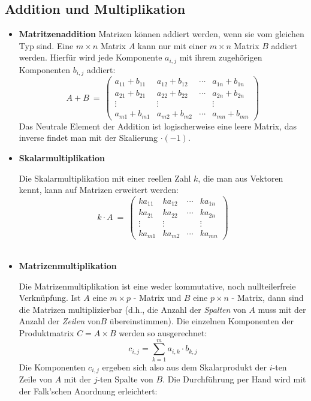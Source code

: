 \documentclass[main.tex]{subfiles}
\begin{document}
\subsection{Addition und Multiplikation}

\begin{itemize}
    \item{\textbf{Matritzenaddition}}
        Matrizen können addiert werden, wenn sie vom gleichen Typ sind. Eine $m\times n$ Matrix $A$ kann nur mit einer $m\times n$ Matrix $B$ addiert werden. Hierfür wird jede Komponente $a_{i,j}$ mit ihrem zugehörigen Komponenten $b_{i,j}$ addiert:
        $$A + B \ = \  \left (
            \begin{array}{cccc}
                a_{11}+ b_{11} & a_{12}+ b_{12} & \cdots & a_{1n}+ b_{1n} \\
                a_{21}+ b_{21} & a_{22}+ b_{22} & \cdots & a_{2n}+ b_{2n} \\
                \vdots & \vdots &  & \vdots \\
                a_{m1}+ b_{m1} & a_{m2}+ b_{m2} & \cdots & a_{mn}+ b_{mn}
            \end{array} \right )$$
        Das Neutrale Element der Addition ist logischerweise eine leere Matrix, das inverse findet man mit der Skalierung $\cdot (-1)$.

    \item{\textbf{Skalarmultiplikation}}

        Die Skalarmultiplikation mit einer reellen Zahl $k$, die man aus Vektoren kennt, kann auf Matrizen erweitert werden:
        $$k\cdot A \ = \ \left (
            \begin{array}{cccc}
                k a_{11} & k a_{12} & \cdots & k a_{1n} \\
                k a_{21} & k a_{22} & \cdots & k a_{2n} \\
                \vdots & \vdots &  & \vdots \\
                k a_{m1} & k a_{m2} & \cdots & k a_{mn}
            \end{array}
            \right ) $$\\

    \item{\textbf{Matrizenmultiplikation}}

        Die Matrizenmultiplikation ist eine weder kommutative, noch nullteilerfreie Verknüpfung. Ist $A$ eine $m\times p$ - Matrix und $B$ eine $p\times n$ - Matrix, dann sind die Matrizen multiplizierbar (d.h., die Anzahl der \textit{Spalten} von $A$ muss mit der Anzahl der \textit{Zeilen} von$B$ übereinstimmen).
        Die einzelnen Komponenten der Produktmatrix $C = A \times B$ werden so ausgerechnet:
        $$c_{i,j} = \sum_{k=1}^{m} a_{i,k} \cdot b_{k,j}$$
        Die Komponenten $c_{i,j}$ ergeben sich also aus dem Skalarprodukt der $i$-ten Zeile von $A$ mit der $j$-ten Spalte von $B$. Die Durchführung per Hand wird mit der Falk'schen Anordnung erleichtert:


\end{itemize}
\end{document}
